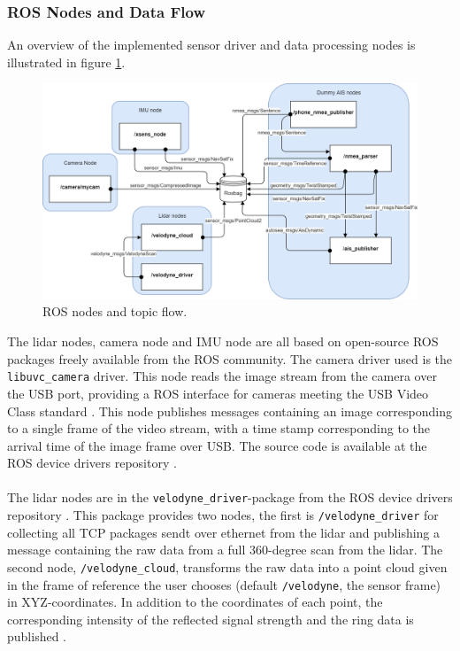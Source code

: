 \subsubsection{ROS Nodes and Data Flow}
An overview of the implemented sensor driver and data processing nodes is illustrated in figure \ref{fig:ros_nodes}.
\begin{figure}[H]
    \centering
    \includegraphics[width=.8\linewidth]{fig/ros.png}
    \caption{ROS nodes and topic flow.}
    \label{fig:ros_nodes}
\end{figure}
The lidar nodes, camera node and IMU node are all based on open-source ROS packages freely available from the ROS community. The camera driver used is the \\\lstinline[basicstyle=\ttfamily]{libuvc_camera} driver. This node reads the image stream from the camera over the USB port, providing a ROS interface for cameras meeting the USB Video Class standard \cite{libuvc_camera}. This node publishes messages containing an image corresponding to a single frame of the video stream, with a time stamp corresponding to the arrival time of the image frame over USB. The source code is available at the ROS device drivers repository \cite{ros_drivers}.\\
\vspace{2mm}\\
\noindent The lidar nodes are in the \lstinline[basicstyle=\ttfamily]{velodyne_driver}-package from the ROS device drivers repository \cite{ros_drivers}. This package provides two nodes, the first is \lstinline[basicstyle=\ttfamily]{/velodyne_driver} for collecting all TCP packages sendt over ethernet from the lidar and publishing a message containing the raw data from a full 360-degree scan from the lidar. The second node, \lstinline[basicstyle=\ttfamily]{/velodyne_cloud}, transforms the raw data into a point cloud given in the frame of reference the user chooses (default \lstinline[basicstyle=\ttfamily]{/velodyne}, the sensor frame) in XYZ-coordinates. In addition to the coordinates of each point, the corresponding intensity of the reflected signal strength and the ring data is published \cite{velodyne_driver}.\\ 
